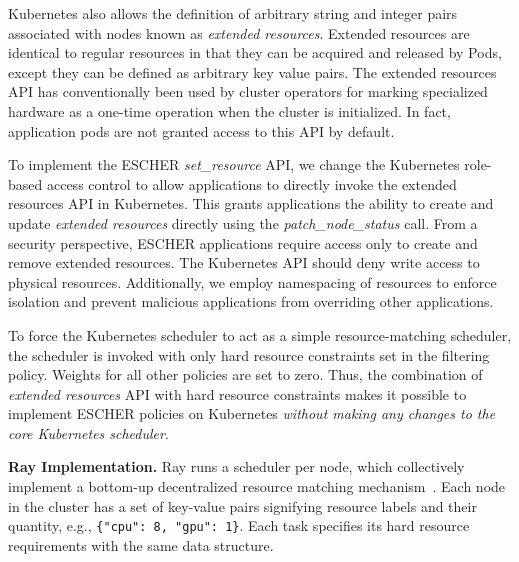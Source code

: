 Kubernetes also allows the definition of arbitrary string and integer pairs associated with nodes known as \textit{extended resources}. Extended resources are identical to regular resources in that they can be acquired and released by Pods, except they can be defined as arbitrary key value pairs.
The extended resources API has conventionally been used by cluster operators for marking specialized hardware as a one-time operation when the cluster is initialized. In fact, application pods are not granted access to this API by default.  

To implement the ESCHER \textit{set\_resource} API, we change the Kubernetes role-based access control to allow applications to directly invoke the extended resources API in Kubernetes. This grants applications the ability to create and update \textit{extended resources} directly using the \textit{patch\_node\_status} call.
From a security perspective, ESCHER applications require access only to create and remove extended resources. The Kubernetes API should deny write access to physical resources. Additionally, we employ namespacing of resources to enforce isolation and prevent malicious applications from overriding other applications.

To force the Kubernetes scheduler to act as a simple resource-matching scheduler, the scheduler is invoked with only hard resource constraints set in the filtering policy. Weights for all other policies are set to zero. Thus, the combination of \textit{extended resources} API with hard resource constraints makes it possible to implement ESCHER policies on Kubernetes \emph{without making any changes to the core Kubernetes scheduler}.


\noindent\textbf{Ray Implementation.}
Ray runs a scheduler per node, which collectively implement a bottom-up decentralized resource matching mechanism~\cite{ray-osdi}. Each node in the cluster has a set of key-value pairs signifying resource labels and their quantity, e.g., \texttt{\{"cpu": 8, "gpu": 1\}}.
Each task specifies its hard resource requirements with the same data structure.

